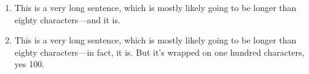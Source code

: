 \begin{enumerate}
\item This is a very long sentence, which is mostly likely going to be longer than eighty characters---and it is.
\item This is a very long sentence, which is mostly likely going to be longer than eighty
characters---in fact, it is. But it's wrapped on one hundred characters, yes 100.
\end{enumerate}
